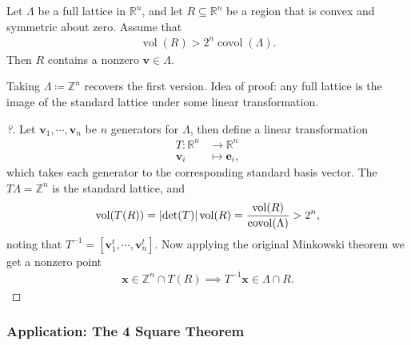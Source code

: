 \begin{theorem}

Let \(\Lambda\) be a full lattice in \({\mathbb{R}}^n\), and let
\(R \subseteq {\mathbb{R}}^n\) be a region that is convex and symmetric
about zero. Assume that
\begin{align*}
\operatorname{vol}(R) > 2^n \operatorname{covol}( \Lambda)
.\end{align*}
Then \(R\) contains a nonzero \(\mathbf{v} \in \Lambda\).

\end{theorem}

\begin{remark}

Taking \(\Lambda\coloneqq{\mathbb{Z}}^n\) recovers the first version.
Idea of proof: any full lattice is the image of the standard lattice
under some linear transformation.

\end{remark}

\begin{proof}[?]

Let \(\mathbf{v}_1, \cdots, \mathbf{v}_n\) be \(n\) generators for
\(\Lambda\), then define a linear transformation
\begin{align*}
T: {\mathbb{R}}^n &\to {\mathbb{R}}^n \\
\mathbf{v}_i &\mapsto \mathbf{e}_i
,\end{align*}
which takes each generator to the corresponding standard basis vector.
The \(T \Lambda = {\mathbb{Z}}^n\) is the standard lattice, and
\begin{align*}
\operatorname{vol}(T(R)) = {\left\lvert { \det(T) } \right\rvert} \operatorname{vol}(R) = {\operatorname{vol}(R) \over \operatorname{covol}( \Lambda) } > 2^n
,\end{align*}
noting that
\(T^{-1}= {\left[ {\mathbf{v}_1^t, \cdots, \mathbf{v}_n^t} \right]}\).
Now applying the original Minkowski theorem we get a nonzero point
\begin{align*}
\mathbf{x}\in {\mathbb{Z}}^n \cap T(R)
\implies T^{-1}\mathbf{x} \in \Lambda \cap R
.\end{align*}

\end{proof}

\hypertarget{application-the-4-square-theorem}{%
\subsubsection{Application: The 4 Square
Theorem}\label{application-the-4-square-theorem}}

